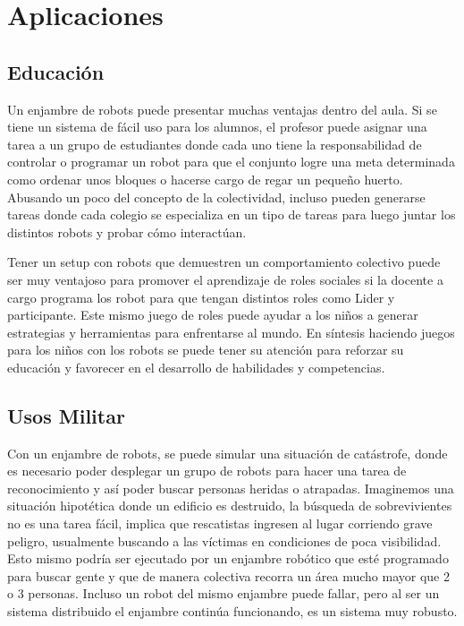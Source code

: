 
\chapter{Aplicaciones} %

\label{ChapterX} %



\section{Educación}

Un enjambre de robots puede presentar muchas ventajas dentro del aula. Si se tiene un sistema de fácil uso para los alumnos, el profesor puede asignar una tarea a un grupo de estudiantes donde cada uno tiene la responsabilidad de controlar o programar un robot para que el conjunto logre una meta determinada como ordenar unos bloques o hacerse cargo de regar un pequeño huerto. Abusando un poco del concepto de la colectividad, incluso pueden generarse tareas donde cada colegio se especializa en un tipo de tareas para luego juntar los distintos robots y probar cómo interactúan.

Tener un setup con robots que demuestren un comportamiento colectivo puede ser muy ventajoso para promover el aprendizaje de roles sociales si la docente a cargo programa los robot para que tengan distintos roles como Lider y participante. Este mismo juego de roles puede ayudar a los niños a generar estrategias y herramientas para enfrentarse al mundo. En síntesis haciendo juegos para los niños con los robots se puede tener su atención para reforzar su educación y favorecer en el desarrollo de habilidades y competencias. 

\section{Usos Militar}

Con un enjambre de robots, se puede simular una situación de catástrofe, donde es necesario poder desplegar un grupo de robots para hacer una tarea de reconocimiento y así poder buscar personas heridas o atrapadas.
Imaginemos una situación hipotética donde un edificio es destruido, la búsqueda de sobrevivientes no es una tarea fácil, implica que rescatistas ingresen al lugar corriendo grave peligro, usualmente buscando a las víctimas en condiciones de poca visibilidad. Esto mismo podría ser ejecutado por un enjambre robótico que esté programado para buscar gente y que de manera colectiva recorra un área mucho mayor que 2 o 3 personas. Incluso un robot del mismo enjambre puede fallar, pero al ser un sistema distribuido el enjambre continúa funcionando, es un sistema muy robusto.

